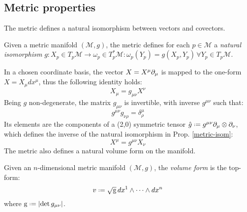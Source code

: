 \subsection{Metric properties}

The metric defines a natural isomorphism between vectors and covectors.

\begin{proposition}\label{metric-isom}
  Given a metric manifold $ (\mathcal{M},g) $, the metric defines for each $ p \in \mathcal{M} $ a \textit{natural isomorphism} $ g : X_p \in T_p \mathcal{M} \rightarrow \omega_p \in T^*_p \mathcal{M} : \omega_p(Y_p) = g(X_p,Y_p) \,\forall Y_p \in T_p \mathcal{M} $.
\end{proposition}

In a chosen coordinate basis, the vector $ X = X^{\mu} \partial_{\mu} $ is mapped to the one-form $ X = X_{\mu} dx^{\mu} $, thus the following identity holds:
\begin{equation}
  X_{\mu} = g_{\mu \nu} X^{\nu}
  \label{eq:3.10}
\end{equation}
Being $ g $ non-degenerate, the matrix $ g_{\mu \nu} $ is invertible, with inverse $ g^{\mu \nu} $ such that:
\begin{equation}
  g^{\mu \nu} g_{\nu \rho} = \delta^{\mu}_{\rho}
  \label{eq:3.11}
\end{equation}
Its elements are the components of a (2,0) symmetric tensor $ \hat{g} \defeq g^{\mu \nu} \pa_{\mu} \otimes \pa_{\nu} $, which defines the inverse of the natural isomorphism in Prop. \ref{metric-isom}:
\begin{equation}
  X^{\mu} = g^{\mu \nu} X_{\nu}
  \label{eq:3.12}
\end{equation}
The metric also defines a natural volume form on the manifold.

\begin{definition}
  Given an $ n $-dimensional metric manifold $ (\mathcal{M},g) $, the \textit{volume form} is the top-form:
  \begin{equation}
    v \defeq \sqg\, dx^1 \wedge \dots \wedge dx^n
    \label{eq:3.13}
  \end{equation}
  where $ \tens{g} \defeq \abs{\det g_{\mu \nu}} $.
\end{definition}

